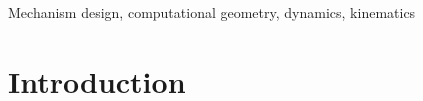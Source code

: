 \documentclass[journal]{IEEEtran}
\begin{document}
\begin{IEEEkeywords}
Mechanism design, computational geometry, dynamics, kinematics
\end{IEEEkeywords}



\IEEEpeerreviewmaketitle


\section{Introduction}
\label{sec:intro}
% 
% 
% 
% 
\end{document}
